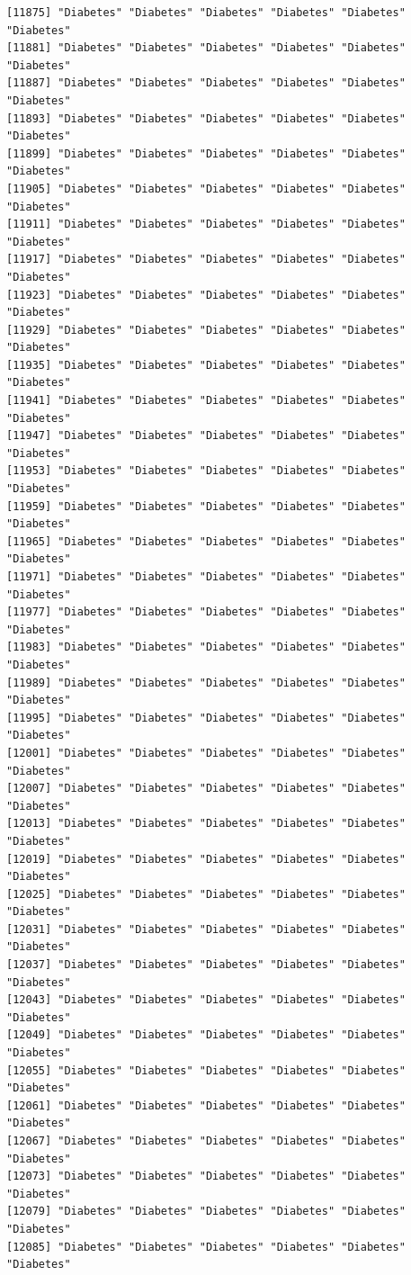 \documentclass[
  letterpaper,
  DIV=11,
  numbers=noendperiod]{scrartcl}
\begin{document}
\begin{verbatim}
[11875] "Diabetes" "Diabetes" "Diabetes" "Diabetes" "Diabetes" "Diabetes"
[11881] "Diabetes" "Diabetes" "Diabetes" "Diabetes" "Diabetes" "Diabetes"
[11887] "Diabetes" "Diabetes" "Diabetes" "Diabetes" "Diabetes" "Diabetes"
[11893] "Diabetes" "Diabetes" "Diabetes" "Diabetes" "Diabetes" "Diabetes"
[11899] "Diabetes" "Diabetes" "Diabetes" "Diabetes" "Diabetes" "Diabetes"
[11905] "Diabetes" "Diabetes" "Diabetes" "Diabetes" "Diabetes" "Diabetes"
[11911] "Diabetes" "Diabetes" "Diabetes" "Diabetes" "Diabetes" "Diabetes"
[11917] "Diabetes" "Diabetes" "Diabetes" "Diabetes" "Diabetes" "Diabetes"
[11923] "Diabetes" "Diabetes" "Diabetes" "Diabetes" "Diabetes" "Diabetes"
[11929] "Diabetes" "Diabetes" "Diabetes" "Diabetes" "Diabetes" "Diabetes"
[11935] "Diabetes" "Diabetes" "Diabetes" "Diabetes" "Diabetes" "Diabetes"
[11941] "Diabetes" "Diabetes" "Diabetes" "Diabetes" "Diabetes" "Diabetes"
[11947] "Diabetes" "Diabetes" "Diabetes" "Diabetes" "Diabetes" "Diabetes"
[11953] "Diabetes" "Diabetes" "Diabetes" "Diabetes" "Diabetes" "Diabetes"
[11959] "Diabetes" "Diabetes" "Diabetes" "Diabetes" "Diabetes" "Diabetes"
[11965] "Diabetes" "Diabetes" "Diabetes" "Diabetes" "Diabetes" "Diabetes"
[11971] "Diabetes" "Diabetes" "Diabetes" "Diabetes" "Diabetes" "Diabetes"
[11977] "Diabetes" "Diabetes" "Diabetes" "Diabetes" "Diabetes" "Diabetes"
[11983] "Diabetes" "Diabetes" "Diabetes" "Diabetes" "Diabetes" "Diabetes"
[11989] "Diabetes" "Diabetes" "Diabetes" "Diabetes" "Diabetes" "Diabetes"
[11995] "Diabetes" "Diabetes" "Diabetes" "Diabetes" "Diabetes" "Diabetes"
[12001] "Diabetes" "Diabetes" "Diabetes" "Diabetes" "Diabetes" "Diabetes"
[12007] "Diabetes" "Diabetes" "Diabetes" "Diabetes" "Diabetes" "Diabetes"
[12013] "Diabetes" "Diabetes" "Diabetes" "Diabetes" "Diabetes" "Diabetes"
[12019] "Diabetes" "Diabetes" "Diabetes" "Diabetes" "Diabetes" "Diabetes"
[12025] "Diabetes" "Diabetes" "Diabetes" "Diabetes" "Diabetes" "Diabetes"
[12031] "Diabetes" "Diabetes" "Diabetes" "Diabetes" "Diabetes" "Diabetes"
[12037] "Diabetes" "Diabetes" "Diabetes" "Diabetes" "Diabetes" "Diabetes"
[12043] "Diabetes" "Diabetes" "Diabetes" "Diabetes" "Diabetes" "Diabetes"
[12049] "Diabetes" "Diabetes" "Diabetes" "Diabetes" "Diabetes" "Diabetes"
[12055] "Diabetes" "Diabetes" "Diabetes" "Diabetes" "Diabetes" "Diabetes"
[12061] "Diabetes" "Diabetes" "Diabetes" "Diabetes" "Diabetes" "Diabetes"
[12067] "Diabetes" "Diabetes" "Diabetes" "Diabetes" "Diabetes" "Diabetes"
[12073] "Diabetes" "Diabetes" "Diabetes" "Diabetes" "Diabetes" "Diabetes"
[12079] "Diabetes" "Diabetes" "Diabetes" "Diabetes" "Diabetes" "Diabetes"
[12085] "Diabetes" "Diabetes" "Diabetes" "Diabetes" "Diabetes" "Diabetes"

\end{verbatim}
\end{document}

